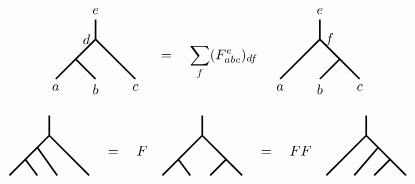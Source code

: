 \documentclass[report,paper=a4, fontsize=12pt, line_length=16cm, number_of_lines=33,dvipdfmx]{jlreq}
\numberwithin{equation}{chapter}
\begin{document}
\begin{align}
    \begin{tikzpicture}[baseline=0]
        \draw[very thick](0,0)--(0.5,0.5) node [left]{$d$};
        \draw[very thick](0,0)--(-0.5,-0.5) node[below]{$a$};
        \draw[very thick](0,0)--(0.5,-0.5) node[below]{$b$};
        \draw[very thick](0.5,0.5)--(1.5,-0.5) node[below]{$c$};
        \draw[very thick](0.5,0.5)--(0.5,1) node[above]{$e$};
    \end{tikzpicture}
    \quad = \quad
    \sum_{f}
    (F_{abc}^e)_{df}
    \quad
    \begin{tikzpicture}[baseline=0]
        \draw[very thick](1,0)--(0.5,0.5) node [right]{$f$};
        \draw[very thick](0.5,0.5)--(-0.5,-0.5) node[below]{$a$};
        \draw[very thick](1,0)--(0.5,-0.5) node[below]{$b$};
        \draw[very thick](1,0)--(1.5,-0.5) node[below]{$c$};
        \draw[very thick](0.5,0.5)--(0.5,1) node[above]{$e$};
    \end{tikzpicture}            
\end{align}

\begin{align}
    \begin{tikzpicture}[baseline=0]
        \draw[very thick](0.5,0.5)--(-0.5,-0.5);
        \draw[very thick](-0.1, -0.1)--(0.2,-0.5);
        \draw[very thick](0.2, 0.2)--(0.7,-0.5);
        \draw[very thick](0.5,0.5)--(1.5,-0.5);
        \draw[very thick](0.5,0.5)--(0.5,1);
    \end{tikzpicture}
    \quad = \quad
    F
    \quad
    \begin{tikzpicture}[baseline=0]
        \draw[very thick](0.5,0.5)--(-0.5,-0.5);
        \draw[very thick](-0.1, -0.1)--(0.2,-0.5);
        \draw[very thick](1.1, -0.1)--(0.7,-0.5);
        \draw[very thick](0.5,0.5)--(1.5,-0.5);
        \draw[very thick](0.5,0.5)--(0.5,1);
    \end{tikzpicture}
    \quad = \quad
    FF\quad
    \begin{tikzpicture}[baseline=0]
        \draw[very thick](0.5,0.5)--(-0.5,-0.5);
        \draw[very thick](0.8, 0.2)--(0.2,-0.5);
        \draw[very thick](1.1, -0.1)--(0.7,-0.5);
        \draw[very thick](0.5,0.5)--(1.5,-0.5);
        \draw[very thick](0.5,0.5)--(0.5,1);
    \end{tikzpicture}
\end{align}
\end{document}
